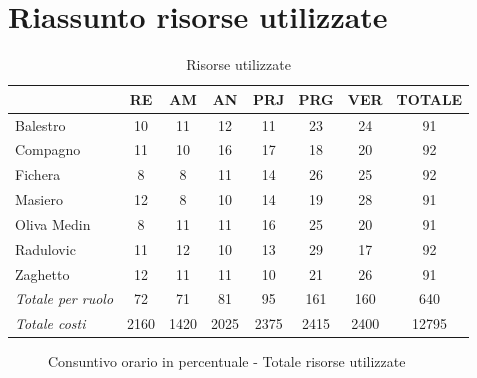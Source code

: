 \documentclass[a4paper,12pt]{article}
\begin{document}
\section{Riassunto risorse utilizzate}
                \begin{table}[H]
                \centering
                \caption{Risorse utilizzate}
                \begin{tabular}{|l|c|c|c|c|c|c|c|}
                \hline
                    \rowcolor{lightgray}{\textbf{Membro}} & {\textbf{RE}} & {\textbf{AM}} & {\textbf{AN}} & {\textbf{PRJ}} & {\textbf{PRG}} & {\textbf{VER}} & {\textbf{TOTALE}}\\
                \hline
                    Balestro & 10 & 11 & 12 & 11 & 23 & 24 & 91\\
                \hline
                    Compagno & 11 & 10 & 16 & 17 & 18 & 20 & 92\\
                \hline
                    Fichera & 8 & 8 & 11 & 14 & 26 & 25 & 92\\
                \hline
                    Masiero & 12 & 8 & 10 & 14 & 19 & 28 & 91\\
                \hline
                    Oliva Medin & 8 & 11 & 11 & 16 & 25 & 20 & 91\\
                \hline
                    Radulovic & 11 & 12 & 10 & 13 & 29 & 17 & 92\\
                \hline
                    Zaghetto & 12 & 11 & 11 & 10 & 21 & 26 & 91\\
                \hline
                    \rowcolor{lightgray}\textit{Totale per ruolo} & 72 & 71 & 81 & 95 & 161 & 160 & 640\\
                \hline
                    \rowcolor{lightgray}\textit{Totale costi} & 2160 & 1420 & 2025 & 2375 & 2415 & 2400 & 12795\\
                \hline
                \end{tabular}
                \end{table}

                \begin{figure}[H]
                \centering
                \caption{Consuntivo orario in percentuale - Totale risorse utilizzate}
                \end{figure}
\end{document}
